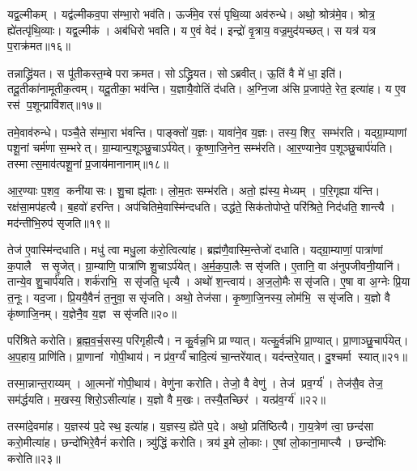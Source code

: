 यद्व॒ल्मीकम्। 
यद्व॑ल्मीकव॒पा स॑म्भा॒रो भव॑ति। 
ऊर्ज॑मे॒व रसं॑ पृथि॒व्या अव॑रुन्धे। 
अथो॒ श्रोत्र॑मे॒व। 
श्रोत्र॒ ह्ये॑तत्पृ॑थि॒व्याः। 
यद्व॒ल्मीक॑। 
अब॑धिरो भवति। 
य ए॒वं वेद॑। 
इन्द्रो॑ वृ॒त्राय॒ वज्र॒मुद॑यच्छत्। 
स यत्र॑ यत्र प॒राक्र॑मत॥१६॥

तन्नाद्ध्रि॑यत। 
स पू॑तीकस्त॒म्बे पराक्रमत। 
सोऽद्ध्रियत। 
सोऽब्रवीत्। 
ऊ॒तिं वै मे॑ धा॒ इति॑। 
तदू॒तीका॑नामूतीक॒त्वम्। 
यदू॒तीका॒ भव॑न्ति। 
य॒ज्ञायै॒वोतिं द॑धति। 
अ॒ग्नि॒जा अ॑सि प्र॒जाप॑ते॒ रेत॒ इत्या॑ह। 
य ए॒व रस॑ प॒शून्प्रावि॑शत्॥१७॥

तमे॒वाव॑रुन्धे। 
पञ्चै॒ते स॑म्भा॒रा भ॑वन्ति। 
पाङ्क्तो॑ य॒ज्ञः। 
यावा॑ने॒व य॒ज्ञः। 
तस्य॒ शिर॒ सम्भ॑रति। 
यद्ग्रा॒म्याणां पशू॒नां चर्म॑णा स॒म्भरेत्। 
ग्रा॒म्यान्प॒शूञ्छु॒चाऽर्प॑येत्। 
कृ॒ष्णा॒जि॒नेन॒ सम्भ॑रति। 
आ॒र॒ण्याने॒व प॒शूञ्छु॒चार्प॑यति। 
तस्मात्स॒माव॑त्पशू॒नां प्र॒जाय॑मानानाम्॥१८॥

आ॒र॒ण्याः प॒शव॒ कनी॑यासः। 
शु॒चा ह्यृ॑ताः। 
लो॒म॒तः सम्भ॑रति। 
अतो॒ ह्य॑स्य॒ मेध्यम्। 
प॒रि॒गृह्या य॑न्ति। 
रक्ष॑सा॒मप॑हत्यै। 
ब॒हवो॑ हरन्ति। 
अप॑चितिमे॒वास्मि॑न्दधति। 
उद्ध॑ते॒ सिक॑तोपोप्ते॒ परि॑श्रिते॒ निद॑धति॒ शान्त्यै। 
मद॑न्तीभि॒रुप॑ सृजति॥१९॥

तेज॑ ए॒वास्मि॑न्दधाति। 
मधु॑ त्वा मधु॒ला क॑रो॒त्वित्या॑ह। 
ब्रह्म॑णै॒वास्मि॒न्तेजो॑ दधाति। 
यद्ग्रा॒म्याणां॒ पात्रा॑णां क॒पालै ससृ॒जेत्। 
ग्रा॒म्याणि॒ पात्रा॑णि शु॒चाऽर्प॑येत्। 
अ॒र्म॒क॒पा॒लैः ससृ॑जति। 
ए॒तानि॒ वा अ॑नुपजीवनी॒यानि॑। 
तान्ये॒व शु॒चार्प॑यति। 
शर्क॑राभि॒ ससृ॑जति॒ धृत्यै। 
अथो॑ श॒न्त्वाय॑। 
अ॒ज॒लो॒मैः ससृ॑जति। 
ए॒षा वा अ॒ग्नेः प्रि॒या त॒नूः। 
यद॒जा। 
प्रि॒ययै॒वैनं॑ त॒नुवा॒ ससृ॑जति। 
अथो॒ तेज॑सा। 
कृ॒ष्णा॒जि॒नस्य॒ लोम॑भि॒ ससृ॑जति। 
य॒ज्ञो वै कृ॑ष्णाजि॒नम्। 
य॒ज्ञेनै॒व य॒ज्ञ ससृ॑जति॥२०॥
\anuvakamend[या॒ज्या॑यै॒ न जु॑हु॒यादवि॑श॒द्वेणु॒ शान्त्यै॑ प॒ङ्क्तिरा॑धस॒मित्या॑ह हरति दिहन्ति प॒राक्र॑म॒तावि॑शत् प्र॒जाय॑मानाना सृजति श॒न्त्वाया॒ष्टौ च॑]

परि॑श्रिते करोति। 
ब्र॒ह्म॒व॒र्च॒सस्य॒ परि॑गृहीत्यै। 
न कु॒र्वन्न॒भि प्राण्यात्। 
यत्कु॒र्वन्न॑भि प्रा॒ण्यात्। 
प्रा॒णाञ्छु॒चार्प॑येत्। 
अ॒प॒हाय॒ प्राणि॑ति। 
प्रा॒णानां गोपी॒थाय॑। 
न प्र॑व॒र्ग्यं॑ चादि॒त्यं चा॒न्तरे॑यात्। 
यद॑न्तरे॒यात्। 
दु॒श्चर्मा स्यात्॥२१॥

तस्मा॒न्नान्त॒राय्यम्। 
आ॒त्मनो॑ गोपी॒थाय॑। 
वेणु॑ना करोति। 
तेजो॒ वै वेणु॑। 
तेज॑ प्रव॒र्ग्य॑। 
तेज॑सै॒व तेज॒ सम॑र्द्धयति। 
म॒खस्य॒ शिरो॒ऽसीत्या॑ह। 
य॒ज्ञो वै म॒खः। 
तस्यै॒तच्छिर॑। 
यत्प्र॑व॒र्ग्य॑॥२२॥

तस्मा॑दे॒वमा॑ह। 
य॒ज्ञस्य॑ प॒दे स्थ॒ इत्या॑ह। 
य॒ज्ञस्य॒ ह्ये॑ते प॒दे। 
अथो॒ प्रति॑ष्ठित्यै। 
गा॒य॒त्रेण॑ त्वा॒ छन्द॑सा करो॒मीत्या॑ह। 
छन्दो॑भिरे॒वैनं॑ करोति। 
त्र्यु॑द्धिं करोति। 
त्रय॑ इ॒मे लो॒काः। 
ए॒षां लो॒काना॒माप्त्यै। 
छन्दो॑भिः करोति॥२३॥


